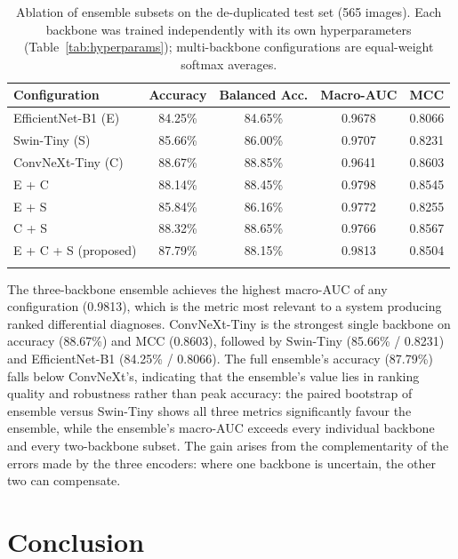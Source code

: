 \documentclass[pdflatex,sn-mathphys-num]{sn-jnl}%
\begin{document}
\begin{table}[htbp]
\caption{Ablation of ensemble subsets on the de-duplicated test set (565 images). Each
backbone was trained independently with its own hyperparameters
(Table~\ref{tab:hyperparams}); multi-backbone configurations are equal-weight softmax
averages.}\label{tab:ablation}
\begin{tabular}{@{}lcccc@{}}
\toprule
Configuration & Accuracy & Balanced Acc. & Macro-AUC & MCC \\
\midrule
EfficientNet-B1 (E) & 84.25\% & 84.65\% & 0.9678 & 0.8066 \\
Swin-Tiny (S) & 85.66\% & 86.00\% & 0.9707 & 0.8231 \\
ConvNeXt-Tiny (C) & 88.67\% & 88.85\% & 0.9641 & 0.8603 \\
\midrule
E + C & 88.14\% & 88.45\% & 0.9798 & 0.8545 \\
E + S & 85.84\% & 86.16\% & 0.9772 & 0.8255 \\
C + S & 88.32\% & 88.65\% & 0.9766 & 0.8567 \\
\midrule
E + C + S (proposed) & 87.79\% & 88.15\% & 0.9813 & 0.8504 \\
\botrule
\end{tabular}
\end{table}

The three-backbone ensemble achieves the highest macro-AUC of any configuration (0.9813),
which is the metric most relevant to a system producing ranked differential diagnoses.
ConvNeXt-Tiny is the strongest single backbone on accuracy (88.67\%) and MCC (0.8603),
followed by Swin-Tiny (85.66\% / 0.8231) and EfficientNet-B1 (84.25\% / 0.8066). The full
ensemble's accuracy (87.79\%) falls below ConvNeXt's, indicating that the ensemble's value
lies in ranking quality and robustness rather than peak accuracy: the paired bootstrap of
ensemble versus Swin-Tiny shows all three metrics significantly favour the ensemble, while the
ensemble's macro-AUC exceeds every individual backbone and every two-backbone subset. The gain
arises from the complementarity of the errors made by the three encoders: where one backbone
is uncertain, the other two can compensate.

\section{Conclusion}\label{sec:conclusion}
\end{document}
